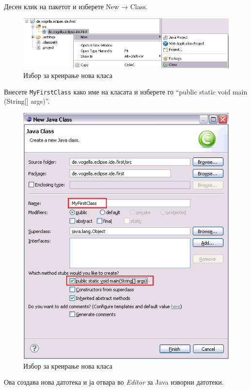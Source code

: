 Десен клик на пакетот и изберете New → Class.

\begin{figure}
\centering
\includegraphics[scale=.5]{images/add-class}
\caption{Избор за креирање нова класа}
\end{figure}

Внесете \texttt{MyFirstClass} како име на класата и изберете го ``public static
void main (String{[}{]} args)''.

\begin{figure}
\centering
\includegraphics[scale=.5]{images/new-class}
\caption{Избор за креирање нова класа}
\end{figure}

Ова создава нова датотека и ја отвара во \emph{Editor} за Java изворни
датотеки. 

